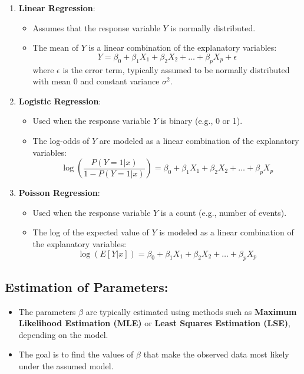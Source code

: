 \documentclass{article}
\begin{document}
\begin{enumerate}
    \item \textbf{Linear Regression}:
    \begin{itemize}
        \item Assumes that the response variable \( Y \) is normally distributed.
        \item The mean of \( Y \) is a linear combination of the explanatory variables:
        \[
        Y = \beta_0 + \beta_1 X_1 + \beta_2 X_2 + \dots + \beta_p X_p + \epsilon
        \]
        where \( \epsilon \) is the error term, typically assumed to be normally distributed with mean 0 and constant variance \( \sigma^2 \).
    \end{itemize}

    \item \textbf{Logistic Regression}:
    \begin{itemize}
        \item Used when the response variable \( Y \) is binary (e.g., 0 or 1).
        \item The log-odds of \( Y \) are modeled as a linear combination of the explanatory variables:
        \[
        \log\left(\frac{P(Y=1 | x)}{1 - P(Y=1 | x)}\right) = \beta_0 + \beta_1 X_1 + \beta_2 X_2 + \dots + \beta_p X_p
        \]
    \end{itemize}

    \item \textbf{Poisson Regression}:
    \begin{itemize}
        \item Used when the response variable \( Y \) is a count (e.g., number of events).
        \item The log of the expected value of \( Y \) is modeled as a linear combination of the explanatory variables:
        \[
        \log(E[Y | x]) = \beta_0 + \beta_1 X_1 + \beta_2 X_2 + \dots + \beta_p X_p
        \]
    \end{itemize}
\end{enumerate}

\subsection*{Estimation of Parameters:}

\begin{itemize}
    \item The parameters \( \beta \) are typically estimated using methods such as \textbf{Maximum Likelihood Estimation (MLE)} or \textbf{Least Squares Estimation (LSE)}, depending on the model.
    \item The goal is to find the values of \( \beta \) that make the observed data most likely under the assumed model.
\end{itemize}
\end{document}
